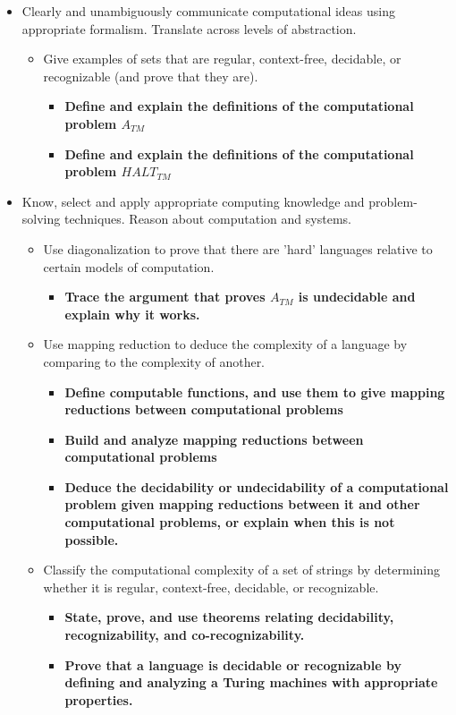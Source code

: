 \begin{itemize}
    \item Clearly and unambiguously communicate computational ideas using appropriate formalism. Translate across levels of abstraction.
    \begin{itemize}
        \item Give examples of sets that are regular, context-free, decidable, or recognizable (and prove that they are).
        \begin{itemize}
          \item {\bf Define and explain the definitions of the computational problem $A_{TM}$}
          \item {\bf Define and explain the definitions of the computational problem $HALT_{TM}$}
       \end{itemize}
    \end{itemize}
    \item Know, select and apply appropriate computing knowledge and problem-solving techniques. Reason about computation and systems.
    \begin{itemize}
        \item Use diagonalization to prove that there are 'hard' languages relative to certain models of computation.
        \begin{itemize}
            \item {\bf Trace the argument that proves $A_{TM}$ is undecidable and explain why it works.}
        \end{itemize}
        \item Use mapping reduction to deduce the complexity of a language by comparing to the complexity of another.
           \begin{itemize}
              \item {\bf Define computable functions, and use them to give mapping reductions between computational problems}
              \item {\bf Build and analyze mapping reductions between computational problems}
              \item {\bf Deduce the decidability or undecidability of a computational problem given mapping reductions between it and other computational problems, or explain when this is not possible.}
           \end{itemize}
    \item Classify the computational complexity of a set of strings by determining whether it is regular, context-free, decidable, or recognizable.
    \begin{itemize}
    \item {\bf State, prove, and use theorems relating decidability, recognizability, and co-recognizability.}
    \item {\bf Prove that a language is decidable or recognizable by defining and analyzing a Turing machines with appropriate properties.}
\end{itemize}
\end{itemize}
\end{itemize}

